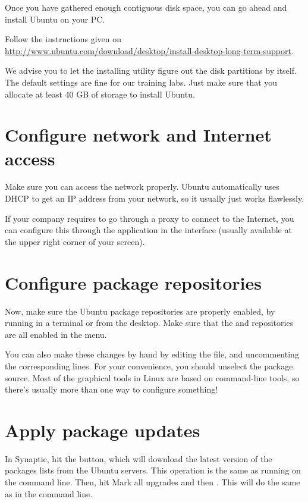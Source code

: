 Once you have gathered enough contiguous disk space,
you can go ahead and install Ubuntu on your PC.

Follow the instructions given on
\url{http://www.ubuntu.com/download/desktop/install-desktop-long-term-support}.

We advise you to let the installing utility figure out the disk
partitions by itself. The default settings are fine for our training
labs. Just make sure that you allocate at least 40 GB of storage to
install Ubuntu.

\section{Configure network and Internet access}

Make sure you can access the network properly. Ubuntu automatically uses DHCP to
get an IP address from your network, so it usually just works flawlessly.

If your company requires to go through a proxy to connect to the Internet, you
can configure this through the  application in the 
interface (usually available at the upper right corner of your screen).

\section{Configure package repositories}

Now, make sure the Ubuntu package repositories are properly enabled, by running
 in a terminal or  from the desktop. Make sure that the 
and  repositories are all enabled in the  menu.

You can also make these changes by hand by editing the
 file, and uncommenting the corresponding lines.
For your convenience, you should unselect the  package source.
Most of the graphical tools in Linux are based on command-line tools, so there's
usually more than one way to configure something!

\section{Apply package updates}
In Synaptic, hit the  button, which will download the latest version of
the packages lists from the Ubuntu servers. This operation is the same as
running  on the command line. Then, hit Mark all
upgrades and then . This will do the same as  in the command line.

